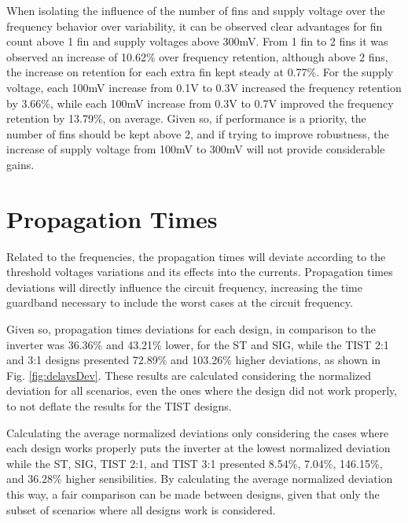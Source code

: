 \documentclass[diss,pgmicro,english]{iiufrgs}
\begin{document}
When isolating the influence of the number of fins and supply voltage over the frequency behavior over variability, it can be observed clear advantages for fin count above 1 fin and supply voltages above 300mV. From 1 fin to 2 fins it was observed an increase of 10.62\% over frequency retention, although above 2 fins, the increase on retention for each extra fin kept steady at 0.77\%. For the supply voltage, each 100mV increase from 0.1V to 0.3V increased the frequency retention by 3.66\%, while each 100mV increase from 0.3V to 0.7V improved the frequency retention by 13.79\%, on average. Given so, if performance is a priority, the number of fins should be kept above 2, and if trying to improve robustness, the increase of supply voltage from 100mV to 300mV will not provide considerable gains.


\section{Propagation Times}

\vspace{-0.5cm}

Related to the frequencies, the propagation times will deviate according to the threshold voltages variations and its effects into the currents. Propagation times deviations will directly influence the circuit frequency, increasing the time guardband necessary to include the worst cases at the circuit frequency.

Given so, propagation times deviations for each design, in comparison to the inverter was 36.36\% and 43.21\% lower, for the ST and SIG, while the TIST 2:1 and 3:1 designs presented 72.89\% and 103.26\% higher deviations, as shown in Fig. \ref{fig:delaysDev}. These results are calculated considering the normalized deviation for all scenarios, even the ones where the design did not work properly, to not deflate the results for the TIST designs.

Calculating the average normalized deviations only considering the cases where each design works properly puts the inverter at the lowest normalized deviation while the ST, SIG, TIST 2:1, and TIST 3:1 presented 8.54\%, 7.04\%, 146.15\%, and 36.28\% higher sensibilities. By calculating the average normalized deviation this way, a fair comparison can be made between designs, given that only the subset of scenarios where all designs work is considered.
\end{document}
